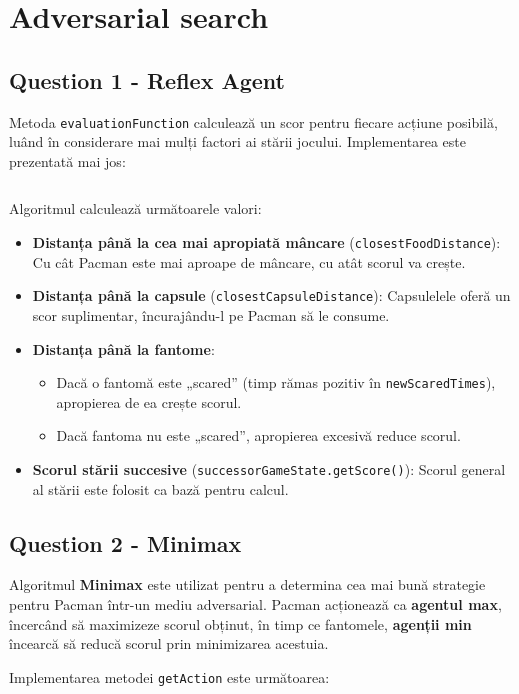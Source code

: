 \section{Adversarial search}
\subsection{Question 1 - Reflex Agent}
\par Metoda \texttt{evaluationFunction} calculează un scor pentru fiecare acțiune posibilă, luând în considerare mai mulți factori ai stării jocului. Implementarea este prezentată mai jos:
\inputminted[linenos]{python}{code/reflex_agent.py}

\par Algoritmul calculează următoarele valori:
\begin{itemize}
	\item \textbf{Distanța până la cea mai apropiată mâncare} (\texttt{closestFoodDistance}): Cu cât Pacman este mai aproape de mâncare, cu atât scorul va crește.
	\item \textbf{Distanța până la capsule} (\texttt{closestCapsuleDistance}): Capsulelele oferă un scor suplimentar, încurajându-l pe Pacman să le consume.
	\item \textbf{Distanța până la fantome}: 
	\begin{itemize}
		\item Dacă o fantomă este „scared” (timp rămas pozitiv în \texttt{newScaredTimes}), apropierea de ea crește scorul.
		\item Dacă fantoma nu este „scared”, apropierea excesivă reduce scorul.
	\end{itemize}
	\item \textbf{Scorul stării succesive} (\texttt{successorGameState.getScore()}): Scorul general al stării este folosit ca bază pentru calcul.
\end{itemize}

\subsection{Question 2 - Minimax}
\par Algoritmul \textbf{Minimax} este utilizat pentru a determina cea mai bună strategie pentru Pacman într-un mediu adversarial. Pacman acționează ca \textbf{agentul max}, încercând să maximizeze scorul obținut, în timp ce fantomele, \textbf{agenții min} încearcă să reducă scorul prin minimizarea acestuia.

\par Implementarea metodei \texttt{getAction} este următoarea:
\inputminted[linenos]{python}{code/minimax.py}


